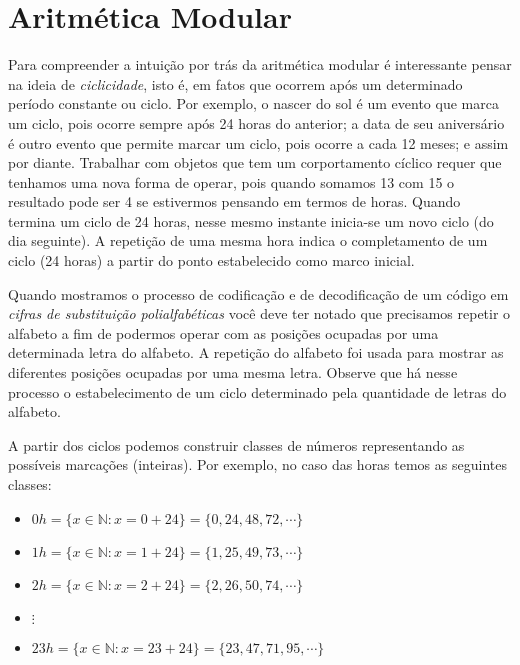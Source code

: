 \section{Aritm\'{e}tica Modular}

Para compreender a intui\c{c}\~{a}o por tr\'{a}s da aritm\'{e}tica modular \'{e} interessante pensar na ideia de \textit{ciclicidade}, 
isto \'{e}, em
fatos que ocorrem ap\'{o}s um determinado per\'{i}odo constante ou ciclo. Por exemplo, o nascer do sol \'{e} um evento que marca um ciclo, pois ocorre sempre ap\'{o}s 24 horas do anterior; a data de seu anivers\'{a}rio \'{e} outro evento que permite marcar um ciclo, pois ocorre a cada 12 meses; e assim por diante. Trabalhar com objetos que tem um corportamento c\'{i}clico requer que tenhamos uma nova forma de operar, pois quando somamos 13 com 15 o resultado pode ser 4 se estivermos pensando em termos de horas. Quando termina um ciclo de 24 horas, nesse mesmo instante inicia-se um novo ciclo (do dia seguinte). A repeti\c{c}\~{a}o de uma mesma hora indica o completamento de um ciclo (24 horas) a partir do ponto estabelecido como marco inicial. 

Quando mostramos o processo de codifica\c{c}\~{a}o e de decodifica\c{c}\~{a}o de um c\'{o}digo em 
\textit{cifras de substitui\c{c}\~{a}o polialfab\'{e}ticas} voc\^{e} deve ter notado que precisamos repetir o alfabeto 
a fim de podermos operar com as posi\c{c}\~{o}es ocupadas por uma determinada letra do alfabeto. A repeti\c{c}\~{a}o do alfabeto 
foi usada para mostrar as diferentes posi\c{c}\~{o}es ocupadas por uma mesma letra. Observe que h\'{a} nesse processo o 
estabelecimento de um ciclo determinado pela quantidade de letras do alfabeto.

A partir dos ciclos podemos construir classes de n\'{u}meros representando as poss\'{i}veis marca\c{c}\~{o}es (inteiras). Por exemplo,  
no caso das horas temos as seguintes classes:  

\begin{itemize}
	\item $0h=\{x\in\mathbb{N}: x=0+24\}=\{0, 24, 48, 72, \cdots\}$ 
	\item $1h=\{x\in\mathbb{N}: x=1+24\}=\{1, 25, 49, 73, \cdots\}$
	\item $2h=\{x\in\mathbb{N}: x=2+24\}=\{2, 26, 50, 74, \cdots\}$
	\item $\vdots$
	\item $23h=\{x\in\mathbb{N}: x=23+24\}=\{23, 47, 71, 95, \cdots\}$
\end{itemize}

